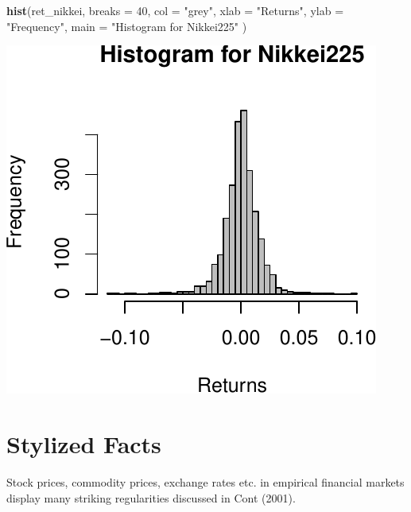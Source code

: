 \documentclass[11pt,]{article}
\newenvironment{Shaded}{\begin{snugshade}}{\end{snugshade}}
\newcommand{\KeywordTok}[1]{\textcolor[rgb]{0.13,0.29,0.53}{\textbf{#1}}}
\newcommand{\DataTypeTok}[1]{\textcolor[rgb]{0.13,0.29,0.53}{#1}}
\newcommand{\DecValTok}[1]{\textcolor[rgb]{0.00,0.00,0.81}{#1}}
\newcommand{\StringTok}[1]{\textcolor[rgb]{0.31,0.60,0.02}{#1}}
\newcommand{\NormalTok}[1]{#1}
\begin{document}
\begin{Shaded}
\begin{Highlighting}[]
\KeywordTok{hist}\NormalTok{(ret_nikkei,}
     \DataTypeTok{breaks =} \DecValTok{40}\NormalTok{,}
     \DataTypeTok{col =} \StringTok{"grey"}\NormalTok{,}
     \DataTypeTok{xlab =} \StringTok{"Returns"}\NormalTok{,}
     \DataTypeTok{ylab =} \StringTok{"Frequency"}\NormalTok{,}
     \DataTypeTok{main =} \StringTok{"Histogram for Nikkei225"}
\NormalTok{     )}
\end{Highlighting}
\end{Shaded}

\begin{center}\includegraphics{FMC_T4_PhD_Fin_Time_Series_files/figure-latex/histograms-3} \end{center}

\section{Stylized Facts}\label{stylized-facts}

Stock prices, commodity prices, exchange rates etc. in empirical
financial markets display many striking regularities discussed in Cont
(2001).
\end{document}
